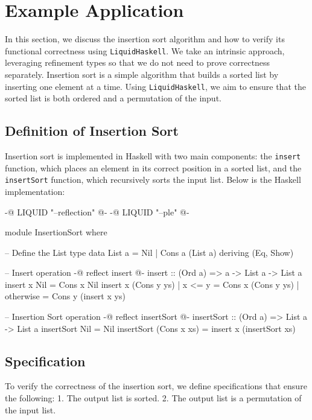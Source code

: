 \documentclass[]{rptuseminar}
\begin{document}
\section{Example Application}
\label{sec:example}

In this section, we discuss the insertion sort algorithm and how to verify its functional correctness using \texttt{LiquidHaskell}.  
We take an intrinsic approach, leveraging refinement types so that we do not need to prove correctness separately.  
Insertion sort is a simple algorithm that builds a sorted list by inserting one element at a time.  
Using \texttt{LiquidHaskell}, we aim to ensure that the sorted list is both ordered and a permutation of the input.  

\subsection{Definition of Insertion Sort}

Insertion sort is implemented in Haskell with two main components: 
the \texttt{insert} function, which places an element in its correct position in a sorted list, 
and the \texttt{insertSort} function, which recursively sorts the input list. Below is the Haskell implementation:

\begin{haskell}
{-@ LIQUID "--reflection" @-}
{-@ LIQUID "--ple" @-}

module InsertionSort where

-- Define the List type
data List a = Nil | Cons a (List a) deriving (Eq, Show)

-- Insert operation
{-@ reflect insert @-}
insert :: (Ord a) => a -> List a -> List a
insert x Nil = Cons x Nil
insert x (Cons y ys)
  | x <= y    = Cons x (Cons y ys)
  | otherwise = Cons y (insert x ys)

-- Insertion Sort operation
{-@ reflect insertSort @-}
insertSort :: (Ord a) => List a -> List a
insertSort Nil = Nil
insertSort (Cons x xs) = insert x (insertSort xs)
\end{haskell}

\subsection{Specification}

To verify the correctness of the insertion sort, we define specifications that ensure the following:
1. The output list is sorted.
2. The output list is a permutation of the input list.
\end{document}
